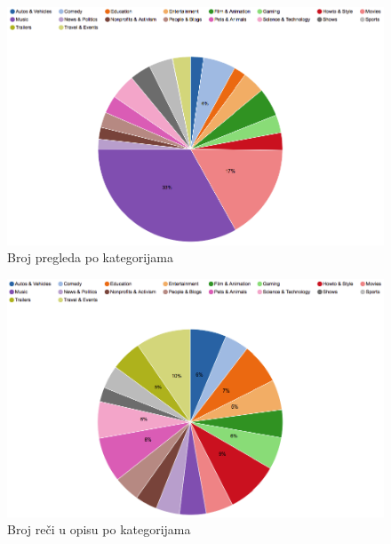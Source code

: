 \documentclass[a4paper]{article}
\theoremstyle{definition}
\begin{document}
\begin{figure}[h!]
\begin{center}
    \includegraphics[width=1\textwidth]{categories_views.png}
    \caption{Broj pregleda po kategorijama}
    \label{fig:brojPregleda}
\end{center}
\end{figure}

\begin{figure}[h!]
\begin{center}
    \includegraphics[width=1\textwidth]{categories_desc.png}
    \caption{Broj reči u opisu po kategorijama}
\end{center}
\end{figure}
\end{document}
